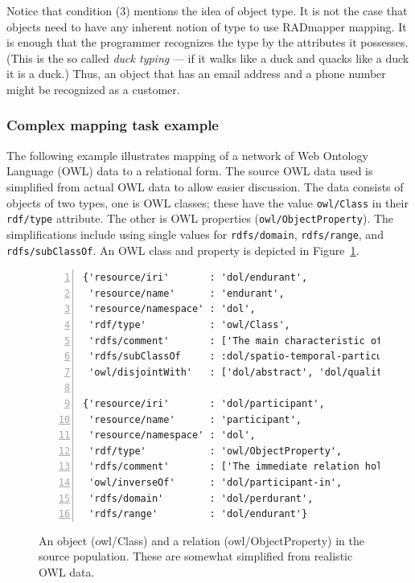 \documentclass[9pt,letterpaper]{article}
\newcommand{\stt}[1]{\texttt{#1}} %
\begin{document}
Notice that condition (3) mentions the idea of object type.
It is not the case that objects need to have any inherent notion of type to use RADmapper mapping.
It is enough that the programmer recognizes the type by the attributes it possesses.
(This is the so called \textit{duck typing} --- if it walks like a duck and quacks like a duck it is a duck.)
Thus, an object that has an email address and a phone number might be recognized as a customer.

\subsubsection{Complex mapping task example}

The following example illustrates mapping of a network of Web Ontology Language (OWL) data to a relational form.
The source OWL data used is simplified from actual OWL data to allow easier discussion.
The data consists of objects of two types, one is OWL classes; these have the value  \stt{owl/Class} in their \stt{rdf/type} attribute.
The other is OWL properties (\stt{owl/ObjectProperty}).
The simplifications include using single values for \stt{rdfs/domain}, \stt{rdfs/range}, and \stt{rdfs/subClassOf}.
An OWL class and property is depicted in Figure~\ref{code:endurant}.

\begin{figure}[H]
  \caption{An object (owl/Class) and a relation (owl/ObjectProperty) in the source population.
    These are somewhat simplified from realistic OWL data.}
  \label{code:endurant}
\begin{lstlisting}[numberstyle=\scriptsize,basicstyle=\ttfamily\scriptsize,numbers=left,stepnumber=1,breaklines=true]
{'resource/iri'       : 'dol/endurant',
 'resource/name'      : 'endurant',
 'resource/namespace' : 'dol',
 'rdf/type'           : 'owl/Class',
 'rdfs/comment'       : ['The main characteristic of endurants is...'],
 'rdfs/subClassOf     : :dol/spatio-temporal-particular,
 'owl/disjointWith'   : ['dol/abstract', 'dol/quality', 'dol/perdurant']}

{'resource/iri'       : 'dol/participant',
 'resource/name'      : 'participant',
 'resource/namespace' : 'dol',
 'rdf/type'           : 'owl/ObjectProperty',
 'rdfs/comment'       : ['The immediate relation holding between endurants and perdurants...'],
 'owl/inverseOf'      : 'dol/participant-in',
 'rdfs/domain'        : 'dol/perdurant',
 'rdfs/range'         : 'dol/endurant'}
\end{lstlisting}
\end{figure}
\end{document}
